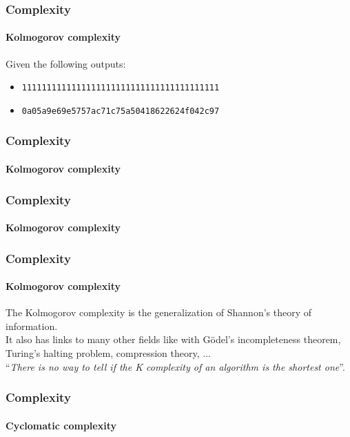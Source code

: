 \begin{frame}
    \frametitle{Complexity}
    \framesubtitle{Kolmogorov complexity}

    Given the following outputs:

    \begin{itemize}[<+->]
        \item \texttt{1111111111111111111111111111111111111111}
        \item \texttt{0a05a9e69e5757ac71c75a50418622624f042c97}
    \end{itemize}
\end{frame}

\begin{frame}
    \frametitle{Complexity}
    \framesubtitle{Kolmogorov complexity}

    
\end{frame}

\begin{frame}
    \frametitle{Complexity}
    \framesubtitle{Kolmogorov complexity}

    
\end{frame}

\begin{frame}
    \frametitle{Complexity}
    \framesubtitle{Kolmogorov complexity}

    The Kolmogorov complexity is the generalization of Shannon's theory of
    information.
    \\
    It also has links to many other fields like with Gödel's incompleteness
    theorem, Turing's halting problem, compression theory, ...
    \\
    \bigskip
     \pause
    ``\textit{There is no way to tell if the K complexity of an algorithm is the
    shortest one}''.
\end{frame}

\begin{frame}
    \frametitle{Complexity}
    \framesubtitle{Cyclomatic complexity}

    
\end{frame}

